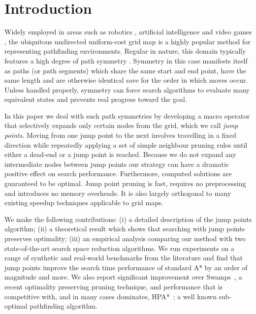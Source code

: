 \section{Introduction}
Widely employed in areas such as robotics \cite{lee09}, artificial intelligence
\cite{wang09} and video games \cite{davis00,sturtevant07}, the ubiquitous
undirected uniform-cost grid map is a highly popular method for representing
pathfinding environments.  Regular in nature, this domain typically features a
high degree of path symmetry \cite{harabor10,pochter10}.  Symmetry in this case
manifests itself as paths (or path segments) which share the same start and end
point, have the same length and are otherwise identical save for the order in
which moves occur.  Unless handled properly, symmetry can force search
algorithms to evaluate many equivalent states and prevents real progress toward
the goal.

In this paper we deal with such path symmetries by developing a macro operator
that selectively expands only certain nodes from the grid, which we call
\emph{jump points}. Moving from one jump point to the next involves travelling
in a fixed direction while repeatedly applying a set of simple neighbour pruning
rules until either a dead-end or a jump point is reached.  Because we do not
expand any intermediate nodes between jump points our strategy can have a
dramatic positive effect on search performance.  Furthermore, computed solutions
are guaranteed to be optimal.  Jump point pruning is fast, requires no
preprocessing and introduces no memory overheads. It is also largely orthogonal to many
existing speedup techniques applicable to grid maps.

We make the following contributions: (i) a detailed description of the jump
points algorithm; (ii) a theoretical result which shows that searching with jump
points preserves optimality;  (iii) an empirical analysis comparing our method
with two state-of-the-art search space reduction algorithms.  We run experiments
on a range of synthetic and real-world benchmarks from the literature and
find that jump points improve the search time performance of standard A* by
an order of magnitude and more.  We also report significant improvement over
Swamps~\cite{pochter10}, a recent optimality preserving pruning technique, and
performance that is competitive with, and in many cases dominates,
HPA*~\cite{botea04}; a well known sub-optimal pathfinding algorithm.
